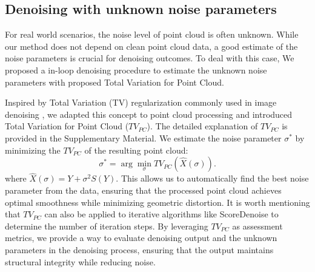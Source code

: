 \subsection{Denoising with unknown noise parameters}
\label{sec:TVPC}
For real world scenarios, the noise level of point cloud is often unknown. While our method does not depend on clean point cloud data, a good estimate of the noise parameters is crucial for denoising outcomes. To deal with this case, We proposed a in-loop denoising procedure to estimate the unknown noise parameters with proposed Total Variation for Point Cloud. 

Inspired by Total Variation (TV) regularization commonly used in image denoising \cite{RUDIN1992}, we adapted this concept to point cloud processing and introduced Total Variation for Point Cloud ($TV_{PC}$). The detailed explanation of $TV_{PC}$ is provided in the Supplementary Material. We estimate the noise parameter \( \sigma^* \) by minimizing the $TV_{PC}$ of the resulting point cloud:
\begin{equation}\label{eq:sigma}
\sigma^* = \arg\min\limits_\sigma TV_{PC}\left(\hat{X}(\sigma)\right).
\end{equation}
where $\hat X(\sigma) = Y + \sigma^2 S(Y)$.
This allows us to automatically find the best noise parameter from the data, ensuring that the processed point cloud achieves optimal smoothness while minimizing geometric distortion. It is worth mentioning that $TV_{PC}$ can also be applied to iterative algorithms like ScoreDenoise to determine the number of iteration steps.
By leveraging $TV_{PC}$ as assessment metrics, we provide a way to evaluate denoising output and the unknown parameters in the denoising process, ensuring that the output maintains structural integrity while reducing noise.


